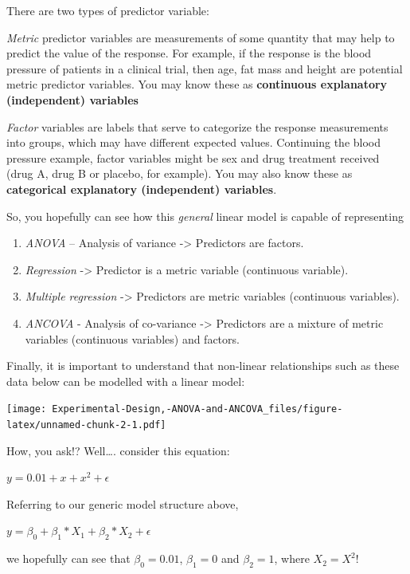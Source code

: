 \documentclass[
]{book}
\providecommand{\tightlist}{%
  \setlength{\itemsep}{0pt}\setlength{\parskip}{0pt}}
\begin{document}
There are two types of predictor variable:

\emph{Metric} predictor variables are measurements of some quantity that may help to predict the value of the response. For example, if the response is the blood pressure of patients in a clinical trial, then age, fat mass and height are potential metric predictor variables. You may know these as \textbf{continuous explanatory (independent) variables}

\emph{Factor} variables are labels that serve to categorize the response measurements into groups, which may have different expected values. Continuing the blood pressure example, factor variables might be sex and drug treatment received (drug A, drug B or placebo, for example). You may also know these as \textbf{categorical explanatory (independent) variables}.

So, you hopefully can see how this \emph{general} linear model is capable of representing

\begin{enumerate}
\def\labelenumi{\arabic{enumi}.}
\tightlist
\item
  \emph{ANOVA} -- Analysis of variance -\textgreater{} Predictors are factors.
\item
  \emph{Regression} -\textgreater{} Predictor is a metric variable (continuous variable).\\
\item
  \emph{Multiple regression} -\textgreater{} Predictors are metric variables (continuous variables).
\item
  \emph{ANCOVA} - Analysis of co-variance -\textgreater{} Predictors are a mixture of metric variables (continuous variables) and factors.
\end{enumerate}

Finally, it is important to understand that non-linear relationships such as these data below can be modelled with a linear model:

\texttt{[image: Experimental-Design,-ANOVA-and-ANCOVA\_files/figure-latex/unnamed-chunk-2-1.pdf]}

How, you ask!? Well\ldots. consider this equation:

\(y = 0.01 + x + x^{2} + \epsilon\)

Referring to our generic model structure above,

\(y = \beta_{0}+\beta_{1}*X_{1}+\beta_{2}*X_{2}+\epsilon\)

we hopefully can see that \(\beta_{0} = 0.01\), \(\beta_{1} = 0\) and \(\beta_{2} = 1\), where \(X_{2} = X^{2}\)!
\end{document}
